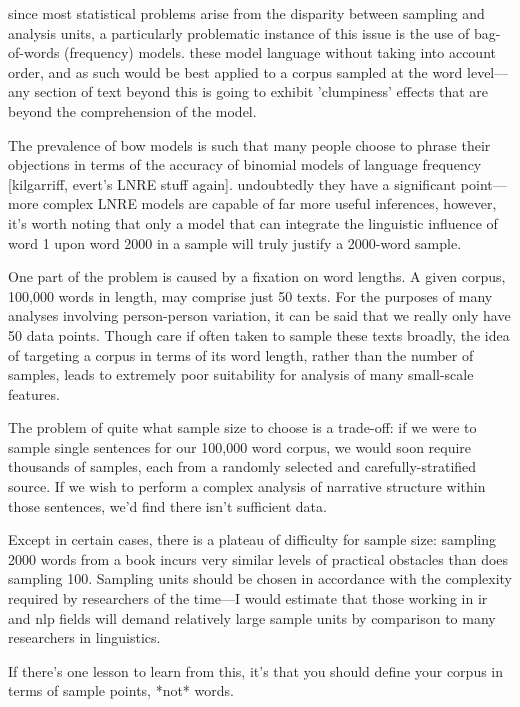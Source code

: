 since most statistical problems arise from the disparity between sampling and analysis units, a particularly problematic instance of this issue is the use of bag-of-words (frequency) models.  these model language without taking into account order, and as such would be best applied to a corpus sampled at the word level---any section of text beyond this is going to exhibit 'clumpiness' effects that are beyond the comprehension of the model.

The prevalence of bow models is such that many people choose to phrase their objections in terms of the accuracy of binomial models of language frequency [kilgarriff, evert's LNRE stuff again]\cite{evert2004simple}\cite{evert2007zipfr}.  undoubtedly they have a significant point---more complex LNRE models are capable of far more useful inferences, however, it's worth noting that only a model that can integrate the linguistic influence of word 1 upon word 2000 in a sample will truly justify a 2000-word sample.


One part of the problem is caused by a fixation on word lengths. A given corpus, 100,000 words in length, may comprise just 50 texts. For the purposes of many analyses involving person-person variation, it can be said that we really only have 50 data points. Though care if often taken to sample these texts broadly, the idea of targeting a corpus in terms of its word length, rather than the number of samples, leads to extremely poor suitability for analysis of many small-scale features.

The problem of quite what sample size to choose is a trade-off: if we were to sample single sentences for our 100,000 word corpus, we would soon require thousands of samples, each from a randomly selected and carefully-stratified source. If we wish to perform a complex analysis of narrative structure within those sentences, we'd find there isn't sufficient data.

Except in certain cases, there is a plateau of difficulty for sample size: sampling 2000 words from a book incurs very similar levels of practical obstacles than does sampling 100. Sampling units should be chosen in accordance with the complexity required by researchers of the time---I would estimate that those working in ir and nlp fields will demand relatively large sample units by comparison to many researchers in linguistics.

If there's one lesson to learn from this, it's that you should define your corpus in terms of sample points, *not* words.




